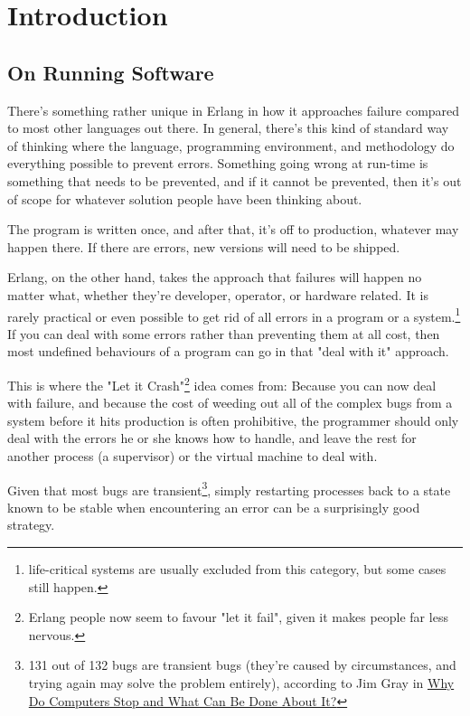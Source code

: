 \documentclass[11pt, oneside]{book}   	%
\begin{document}
\chapter{Introduction}
\label{chap:introduction}

\section{On Running Software}
\label{sec:on-running-software}

There's something rather unique in Erlang in how it approaches failure compared to most other languages out there. In general, there's this kind of standard way of thinking where the language, programming environment, and methodology do everything possible to prevent errors. Something going wrong at run-time is something that needs to be prevented, and if it cannot be prevented, then it's out of scope for whatever solution people have been thinking about.

The program is written once, and after that, it's off to production, whatever may happen there. If there are errors, new versions will need to be shipped.

Erlang, on the other hand, takes the approach that failures will happen no matter what, whether they're developer, operator, or hardware related. It is rarely practical or even possible to get rid of all errors in a program or a system.\footnote{life-critical systems are usually excluded from this category, but some cases still happen.} If you can deal with some errors rather than preventing them at all cost, then most undefined behaviours of a program can go in that "deal with it" approach.

This is where the "Let it Crash"\footnote{Erlang people now seem to favour "let it fail", given it makes people far less nervous.} idea comes from: Because you can now deal with failure, and because the cost of weeding out all of the complex bugs from a system before it hits production is often prohibitive, the programmer should only deal with the errors he or she knows how to handle, and leave the rest for another process (a supervisor) or the virtual machine to deal with.

Given that most bugs are transient\footnote{131 out of 132 bugs are transient bugs (they're caused by circumstances, and trying again may solve the problem entirely), according to Jim Gray in \href{http://www.hpl.hp.com/techreports/tandem/TR-85.7.html}{Why Do Computers Stop and What Can Be Done About It?}}, simply restarting processes back to a state known to be stable when encountering an error can be a surprisingly good strategy.
\end{document}
